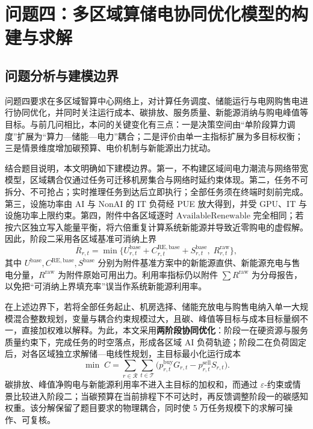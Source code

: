 
\section{问题四：多区域算储电协同优化模型的构建与求解}

\subsection{问题分析与建模边界}

问题四要求在多区域智算中心网络上，对计算任务调度、储能运行与电网购售电进行协同优化，并同时关注运行成本、碳排放、服务质量、新能源消纳与购电峰值等目标。与前几问相比，本问的关键变化有三点：一是决策空间由“单阶段算力调度”扩展为“算力—储能—电力”耦合；二是评价由单一主指标扩展为多目标权衡；三是情景维度增加碳预算、电价机制与新能源出力扰动。

结合题目说明，本文明确如下建模边界。第一，不构建区域间电力潮流与网络带宽模型，区域耦合仅通过任务可迁移机房集合与网络时延约束体现。第二，任务不可拆分、不可抢占；实时推理任务到达后立即执行；全部任务须在终端时刻前完成。第三，设施功率由 AI 与 NonAI 的 IT 负荷经 PUE 放大得到，并受 GPU、IT 与设施功率上限约束。第四，附件中各区域逐时 \(\mathrm{AvailableRenewable}\) 完全相同；若按六区独立写入能量平衡，将六倍重复计算系统新能源并导致近零购电的虚假解。因此，阶段二采用各区域基准可消纳上界
\begin{equation}
\overline{R}_{r,t}
=
\min\bigl\{
U^{\mathrm{base}}_{r,t}+C^{\mathrm{RE,base}}_{r,t}+S^{\mathrm{base}}_{r,t},\;
R^{\mathrm{raw}}_{r,t}
\bigr\},
\end{equation}
其中 \(U^{\mathrm{base}},C^{\mathrm{RE,base}},S^{\mathrm{base}}\) 分别为附件基准方案中的新能源直供、新能源充电与售电分量，\(R^{\mathrm{raw}}\) 为附件原始可用出力。利用率指标仍以附件 \(\sum R^{\mathrm{raw}}\) 为分母报告，以免把“可消纳上界填充率”误当作系统新能源利用率。

在上述边界下，若将全部任务起止、机房选择、储能充放电与购售电纳入单一大规模混合整数规划，变量与耦合约束规模过大，且碳、峰值等目标与成本目标量纲不一，直接加权难以解释。为此，本文采用\textbf{两阶段协同优化}：阶段一在硬资源与服务质量约束下，完成任务的时空落点，形成各区域 AI 负荷轨迹；阶段二在负荷固定后，对各区域独立求解储—电线性规划，主目标最小化运行成本
\begin{equation}
\min\;
C
=
\sum_{r\in\mathcal{R}}
\sum_{t\in\mathcal{T}}
\bigl(
p^{\mathrm{buy}}_{r,t}G_{r,t}
-
p^{\mathrm{sell}}_{r,t}S_{r,t}
\bigr).
\end{equation}
碳排放、峰值净购电与新能源利用率不进入主目标的加权和，而通过 \(\varepsilon\)-约束或情景比较进入阶段二；当碳预算在当前排程下不可达时，再反馈调整阶段一的碳感知权重。该分解保留了题目要求的物理耦合，同时使 5 万任务规模下的求解可操作、可复核。

